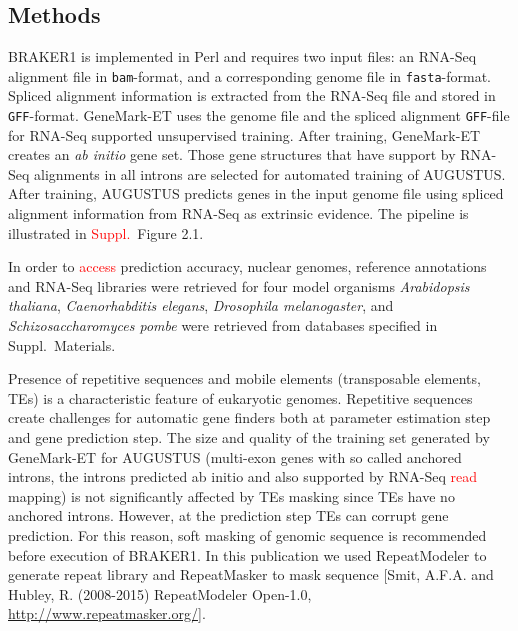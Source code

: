 \documentclass{bioinfo}
\begin{document}
\begin{methods}
\section{Methods}

BRAKER1 is implemented in Perl and requires two input files: an RNA-Seq alignment file in \texttt{bam}-format, and a corresponding genome file in \texttt{fasta}-format. Spliced alignment information is extracted from the RNA-Seq file and stored in \texttt{GFF}-format. GeneMark-ET uses the genome file and  the spliced alignment \texttt{GFF}-file for RNA-Seq supported unsupervised training. After training, GeneMark-ET creates an \textit{ab initio} gene set. Those gene structures that have support by RNA-Seq alignments in all introns are selected for automated training of AUGUSTUS. After training, AUGUSTUS predicts genes in the input genome file using spliced alignment information from RNA-Seq as extrinsic evidence. The pipeline is illustrated in \textcolor{red}{Suppl.~}Figure 2.1.




In order to \textcolor{red}{access} prediction accuracy, nuclear genomes, reference annotations and RNA-Seq libraries were retrieved for four model organisms \textit{Arabidopsis thaliana}, \textit{Caenorhabditis elegans}, \textit{Drosophila melanogaster}, and \textit{Schizosaccharomyces pombe} were retrieved from databases specified in Suppl.~Materials.

Presence of repetitive sequences and mobile elements (transposable elements, TEs) is a characteristic feature of eukaryotic genomes. Repetitive sequences create challenges for automatic gene finders both at parameter estimation step and gene prediction step. The size and quality of the training set generated by GeneMark-ET for AUGUSTUS (multi-exon genes with so called anchored introns, the introns predicted ab initio and also supported by RNA-Seq \textcolor{red}{read} mapping) is not significantly affected by TEs masking since TEs have no anchored introns. However, at the prediction step TEs can corrupt gene prediction. For this reason, soft masking of genomic sequence is recommended before execution of BRAKER1. In this publication we used RepeatModeler to generate repeat library and RepeatMasker to mask sequence [Smit, A.F.A. and Hubley, R. (2008-2015) RepeatModeler Open-1.0, \url{http://www.repeatmasker.org/}].

\end{methods}
\end{document}
